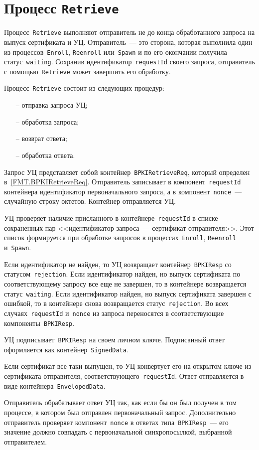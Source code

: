 \section{Процесс \texttt{Retrieve}}\label{PROCESSES.Retrieve}

Процесс~\texttt{Retrieve} выполняют отправитель не до конца обработанного
запроса на выпуск сертификата и УЦ.  Отправитель~--- это сторона, которая 
выполнила один из процессов~\texttt{Enroll}, \texttt{Reenroll} 
или~\texttt{Spawn} и по его окончании получила статус~\texttt{waiting}. 
Сохранив идентификатор~\texttt{requestId} своего запроса, отправитель с 
помощью~\texttt{Retrieve} может завершить его обработку.

Процесс~\texttt{Retrieve} состоит из следующих процедур:
\begin{itemize}
\item[--]
отправка запроса УЦ;
\item[--]
обработка запроса;
\item[--]
возврат ответа;
\item[--]
обработка ответа.
\end{itemize}

Запрос УЦ представляет собой контейнер~\texttt{BPKIRetrieveReq},
который определен в~\ref{FMT.BPKIRetrieveReq}.
Отправитель записывает в компонент~\texttt{requestId} контейнера
идентификатор первоначального запроса, а в компонент~\texttt{nonce}~---
случайную строку октетов. Контейнер отправляется УЦ.

УЦ проверяет наличие присланного в контейнере~\texttt{requestId} в списке 
сохраненных пар <<идентификатор запроса~--- сертификат отправителя>>. Этот 
список формируется при обработке запросов в процессах~\texttt{Enroll}, 
\texttt{Reenroll} и~\texttt{Spawn}. 

Если идентификатор не найден, то УЦ возвращает контейнер~\texttt{BPKIResp}
со статусом~\texttt{rejection}. 
%
Если идентификатор найден, но выпуск сертификата по соответствующему 
запросу все еще не завершен, то в контейнере возвращается 
статус~\texttt{waiting}.  
%
Если идентификатор найден, но выпуск сертификата завершен с ошибкой,
то в контейнере снова возвращается статус~\texttt{rejection}. 
%
Во всех случаях~\texttt{requestId} и~\texttt{nonce} из запроса переносятся 
в соответствующие компоненты~\texttt{BPKIResp}. 

УЦ подписывает~\texttt{BPKIResp} на своем личном ключе. Подписанный ответ 
оформляется как контейнер~\texttt{SignedData}.

Если сертификат все-таки выпущен, то УЦ конвертует его 
на открытом ключе из сертификата отправителя, 
соответствующего~\texttt{requestId}. Ответ отправляется
в виде контейнера~\texttt{EnvelopedData}.

Отправитель обрабатывает ответ УЦ так, как если бы он был получен в 
том процессе, в котором был отправлен первоначальный запрос.
Дополнительно отправитель проверяет компонент~\texttt{nonce}
в ответах типа~\texttt{BPKIResp}~--- его значение должно совпадать 
с первоначальной синхропосылкой, выбранной отправителем.

